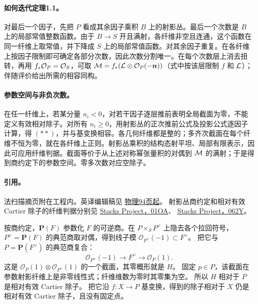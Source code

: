 \paragraph{如何迭代定理1.1。}
对最后一个因子，先把 \(P\) 看成其余因子乘积 \(B\) 上的射影丛。最后一个次数是 \(B\) 上的局部常值整数函数。由于 \(B\to S\) 开且满射，各纤维非空且连通，这个函数在同一纤维上取常值，并下降成 \(S\) 上的局部常值函数。对其余因子重复。在各纤维上按因子限制即可确定各部分次数，因此次数分割唯一。在每个次数层上消去扭转，再用 \(f_*\OO_P=\OO_S\)，可取
\(\MM=f_*(\LL\otimes\OO_P(-\nn))\)（式中按该层限制 \(f\) 和 \(\mathcal L\)）；伴随评价给出所需的相容同构。

\paragraph{参数空间与非负次数。}
在任一纤维上，若某分量 \(n_i<0\)，对若干因子逐层推前表明全局截面为零，不能定义有效相对除子。对所有 \(n_i\ge0\)，用射影丛的正次推前公式及投影公式逐因子计算，得 \((**)\)，并与基变换相容。各几何纤维都是整的；多齐次截面在每个纤维不恒为零，就在各纤维上正则。射影丛乘积的结构态射平坦、局部有限表示，因此可应用纤维判据。截面等价于从上述对称幂张量积的对偶到 \(\mathcal M\) 的满射；于是得到商约定下的参数空间。零多次数对应空除子。

\paragraph{引用。}
法扫描摘页附在工程内。英译编辑稿见
\href{https://webusers.imj-prg.fr/~leila.schneps/grothendieckcircle/EGA/EGA5trans.pdf#page=94}{物理94页起}。
射影丛商约定和相对有效 Cartier 除子的纤维判据分别见
\href{https://stacks.math.columbia.edu/tag/01OA}{Stacks Project，01OA}、
\href{https://stacks.math.columbia.edu/tag/062Y}{Stacks Project，062Y}。
\par\endgroup

\begingroup
\def\Div{\operatorname{Div}}
\def\Supp{\operatorname{Supp}}
\def\Ass{\operatorname{Ass}}
\def\Spec{\operatorname{Spec}}
\def\PP{\mathbf P}
\def\OO{\mathcal O}
\hypertarget{audit:L18-078}{}
按商约定，\(\PP(F)\) 参数化 \(F\) 的可逆商。在 \(P\times_S P^\vee\) 上隐去各个拉回符号，
\(P^\vee=\PP(F)\) 的典范商取对偶，得到线子模 \(\OO_{P^\vee}(-1)\subset F^\vee\)。
把它与 \(P=\PP(F^\vee)\) 的典范商复合：
\[
 \OO_{P^\vee}(-1)\longrightarrow F^\vee
          \longrightarrow\OO_P(1).
\]
这是 \(\OO_P(1)\otimes\OO_{P^\vee}(1)\) 的一个截面，其零概形就是 \(H\)。
固定 \(p\in P\)，该截面在参数射影纤维上是非零线性式；纤维维数为零时其零集为空。
所以 \(H\) 相对于 \(P\) 是相对有效 Cartier 除子。
把它沿 \(f:X\to P\) 基变换，得到的除子相对于 \(X\) 仍是相对有效 Cartier 除子，且没有固定点。

